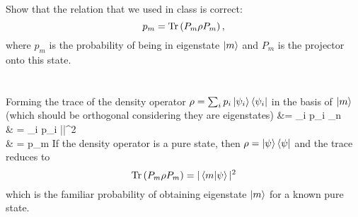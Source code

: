 \documentclass[11pt,letterpaper]{article}
\begin{document}
	Show that the relation that we used in class is correct:
	\[
		p_m = \text{Tr}\left(P_m\rho P_m\right),
	\]
	where $p_m$ is the probability of being in eigenstate $\ket m$ and $P_m$ is the projector onto this state.
	\\
	\\
	\\
	Forming the trace of the density operator $\rho = \sum_i p_i\ket{\psi_i}\bra{\psi_i}$ in the basis of $\ket m$ (which 
	should be orthogonal considering they are eigenstates)
	\ba
		\tr{} &= \sum_i p_i \sum_n \\
		& = \sum_i p_i ||^2 \\
		& =  p_m
	\ea
	If the density operator is a pure state, then $\rho = \ket\psi\bra\psi$ and the trace reduces to
	\[
		\text{Tr}\left(P_m\rho P_m\right) =  |\braket{m|\psi}|^2
	\]
	which is the familiar probability of obtaining eigenstate $\ket m$ for a known pure state. 
		
\eenum
\end{document}
